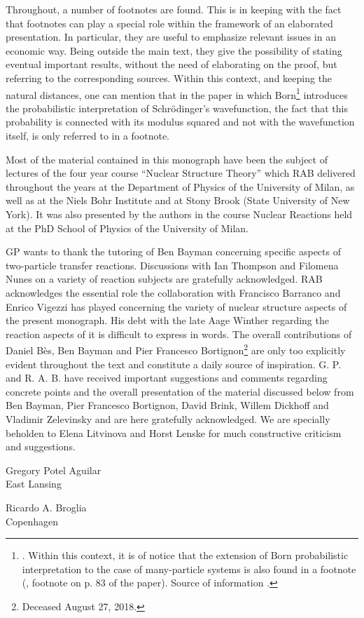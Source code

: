 \newpage
Throughout, a number of footnotes are found. This is in keeping with the fact that footnotes can play a special role within the framework of an elaborated presentation. In particular, they are useful to emphasize relevant issues in an economic way. Being outside the main text, they give the possibility of stating eventual important results, without the need of elaborating on the proof, but referring to the corresponding sources.
 Within this context, and keeping the natural distances, one can mention that in the paper  in which Born\footnote{\cite{Born:26}. Within this context, it is of notice that the extension of Born probabilistic interpretation to the case of many-particle systems is also found in a footnote (\cite{Pauli:27}, footnote on p. 83 of the paper). Source of information \cite{Pais:86}.} introduces the probabilistic interpretation of Schr\"odinger's  wavefunction, the fact that this probability is connected with its modulus squared and not with the wavefunction itself, is only referred to in a footnote.



  Most of the material contained in this monograph have been the subject of lectures of the four year course ``Nuclear Structure Theory'' which RAB delivered throughout the years at the Department of Physics of the University of Milan, as well as at the Niels Bohr Institute and at Stony Brook (State University of New York). It was also presented by the authors in the course Nuclear Reactions held at the PhD School of Physics of the University of Milan.

GP wants to thank the tutoring of  Ben Bayman concerning specific aspects of two-particle transfer reactions. Discussions with Ian Thompson and Filomena Nunes on a variety of reaction subjects are gratefully acknowledged. 
RAB  acknowledges the essential role the collaboration with Francisco Barranco and Enrico Vigezzi has played concerning the variety of nuclear structure aspects of the present monograph. His debt with the late Aage Winther regarding the reaction aspects of it is difficult to express in words. The overall contributions of Daniel B\`{e}s, Ben Bayman and Pier Francesco Bortignon\footnote{Deceased August 27, 2018.} are only too explicitly evident throughout the text and constitute a daily source of inspiration.  G. P. and R. A. B. have received important suggestions and comments regarding concrete points and the overall presentation of the material discussed below from Ben Bayman, Pier Francesco Bortignon, David Brink, Willem Dickhoff and Vladimir Zelevinsky and are here gratefully acknowledged. We are specially beholden to Elena Litvinova and Horst Lenske for much constructive criticism and suggestions.
\begin{flushleft}
Gregory Potel Aguilar\\
 East Lansing
\end{flushleft}
\vspace{-1.7cm}
\begin{flushright}
Ricardo A. Broglia\\
 Copenhagen
\end{flushright}

%
%
